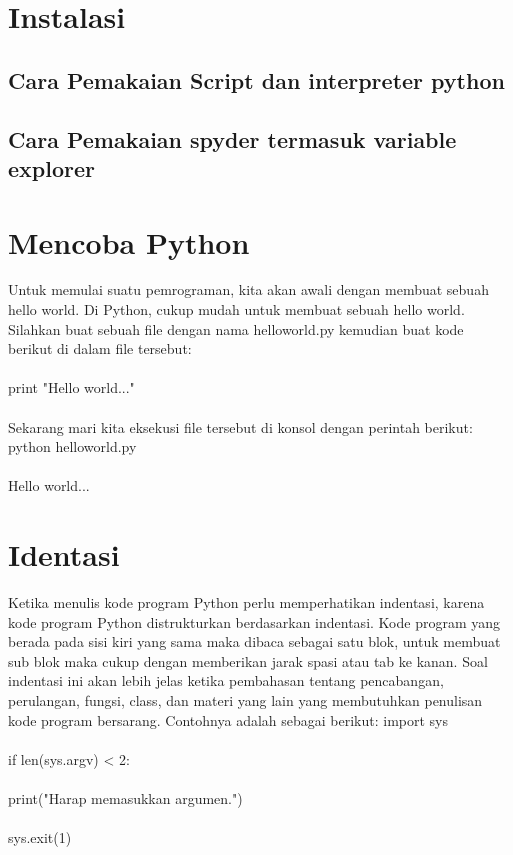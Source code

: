\section{Instalasi}
\subsection{Cara Pemakaian Script dan interpreter python}
\subsection{Cara Pemakaian spyder termasuk variable explorer}

\section{Mencoba Python}
Untuk memulai suatu pemrograman, kita akan awali dengan membuat sebuah hello world. Di Python, cukup mudah untuk membuat sebuah hello world. Silahkan buat sebuah file dengan nama helloworld.py kemudian buat kode berikut di dalam file tersebut:
\paragraph{}
print "Hello world..."
\paragraph{}
Sekarang mari kita eksekusi file tersebut di konsol dengan perintah berikut:
python helloworld.py
\paragraph{}
Hello world...

\section{Identasi}
Ketika menulis kode program Python perlu memperhatikan indentasi, karena kode program Python distrukturkan berdasarkan indentasi. Kode program yang berada pada sisi kiri yang sama maka dibaca sebagai satu blok, untuk membuat sub blok maka cukup dengan memberikan jarak spasi atau tab ke kanan.
Soal indentasi ini akan lebih jelas ketika pembahasan tentang pencabangan, perulangan, fungsi, class, dan materi yang lain yang membutuhkan penulisan kode program bersarang.
Contohnya adalah sebagai berikut:
import sys
\paragraph{}
if len(sys.argv) < 2:
\paragraph{}
    print("Harap memasukkan argumen.")
    \paragraph{}
    sys.exit(1)
